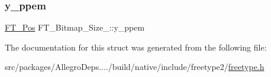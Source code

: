 \subsubsection{\texorpdfstring{y\+\_\+ppem}{y\_ppem}}
{\footnotesize\ttfamily \hyperlink{ftimage_8h_af5f230f4b253d4c7715fd2e595614c90}{F\+T\+\_\+\+Pos} F\+T\+\_\+\+Bitmap\+\_\+\+Size\+\_\+\+::y\+\_\+ppem}



The documentation for this struct was generated from the following file\+:\begin{DoxyCompactItemize}
\item 
src/packages/\+Allegro\+Deps..../build/native/include/freetype2/\hyperlink{freetype_8h}{freetype.\+h}\end{DoxyCompactItemize}
